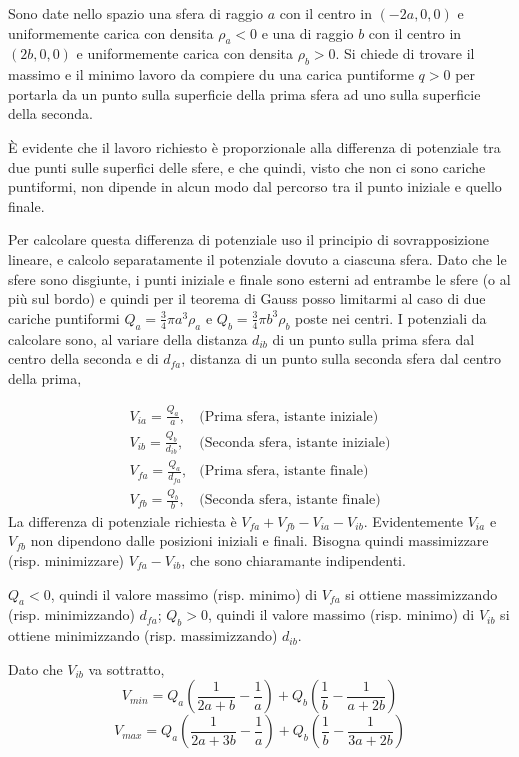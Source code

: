 \documentclass[../main.tex]{subfiles}
\begin{document}

\textex
Sono date nello spazio una sfera di raggio $a$ con il centro in $(-2a,0,0)$ e uniformemente carica con densita $\rho_a<0$ e una di raggio $b$ con il centro in $(2b,0,0)$ e uniformemente carica con densita $\rho_b>0$. Si chiede di trovare il massimo e il minimo lavoro da compiere du una carica puntiforme $q>0$ per portarla da un punto sulla superficie della prima sfera ad uno sulla superficie della seconda.

\solution
\`E evidente che il lavoro richiesto \`e proporzionale alla differenza di potenziale tra due punti sulle superfici delle sfere, e che quindi, visto che non ci sono cariche puntiformi, non dipende in alcun modo dal percorso tra il punto iniziale e quello finale.

Per calcolare questa differenza di potenziale uso il principio di sovrapposizione lineare, e calcolo separatamente il potenziale dovuto a ciascuna sfera. Dato che le sfere sono disgiunte, i punti iniziale e finale sono esterni ad entrambe le sfere (o al pi\`u sul bordo) e quindi per il teorema di Gauss posso limitarmi al caso di due cariche puntiformi $Q_a=\frac{3}{4} \pi a^3 \rho_a $ e $Q_b=\frac{3}{4} \pi b^3 \rho_b $  poste nei centri.\newline
I potenziali da calcolare sono, al variare della distanza $d_{ib}$ di un punto sulla prima sfera dal centro della seconda e di $d_{fa}$, distanza di un punto sulla seconda sfera dal centro della prima,

\begin{subequations}
  \label{dsc:potenziali}
  \begin{align}
    V_{ia}=\frac{Q_a}{a},	& \text{(Prima sfera, istante iniziale)} \\
    V_{ib}=\frac{Q_b}{d_{ib}},	& \text{(Seconda sfera, istante iniziale)} \\
    V_{fa}=\frac{Q_a}{d_{fa}},	& \text{(Prima sfera, istante finale)} \\
    V_{fb}=\frac{Q_b}{b},	& \text{(Seconda sfera, istante finale)}
  \end{align}
\end{subequations}
La differenza di potenziale richiesta \`e $V_{fa}+V_{fb}-V_{ia}-V_{ib}$.
Evidentemente $V_{ia}$ e $V_{fb}$ non dipendono dalle posizioni iniziali e finali. Bisogna quindi massimizzare (risp. minimizzare) $V_{fa}-V_{ib}$, che sono chiaramante indipendenti.

$Q_a<0$, quindi il valore massimo (risp. minimo) di $V_{fa}$ si ottiene massimizzando (risp. minimizzando) $d_{fa}$; $Q_b>0$, quindi il valore massimo (risp. minimo) di $V_{ib}$ si ottiene minimizzando (risp. massimizzando) $d_{ib}$.

Dato che $V_{ib}$ va sottratto,
\begin{equation*}
  V_{min}=Q_a \left(\frac{1}{2a+b}- \frac{1}{a} \right)+Q_b\left(\frac{1}{b}-\frac{1}{a+2b}\right)
\end{equation*}
\begin{equation*}
  V_{max}=Q_a\left(\frac{1}{2a+3b}- \frac{1}{a}\right)+Q_b\left(\frac{1}{b}-\frac{1}{3a+2b}\right)
\end{equation*}
\end{document}
